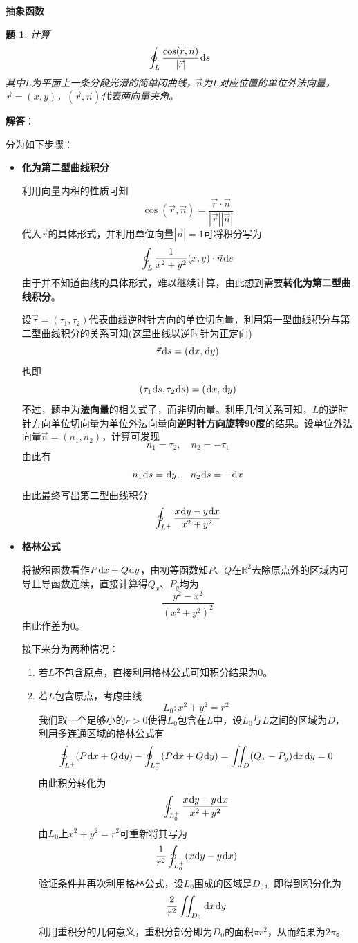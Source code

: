 \documentclass[a4paper,UTF8,fontset=windows,AutoFakeBold]{ctexart}
\newcommand*{\dr}{\hspace{0.07em}\mathrm{d}}
\newcommand*{\nv}{\vec{n}}
\newcommand*{\rb}{\mathbb{R}}
\newcommand*{\rv}{\vec{r}}
\theoremstyle{ex}
\newtheorem{exercise}{题}
\newcommand{\sol}[1]{{\vspace{5pt}\kaishu\noindent\textbf{解答}：\vspace{-3pt}
\begin{compactitem}
    \item[] #1
\end{compactitem}
}}
\begin{document}
\noindent\textbf{抽象函数}
\begin{framed}
\begin{exercise}\label{green normal}
    计算
    $$\oint_L\frac{\cos(\rv,\nv)}{|\rv|}\dr s$$
    其中$L$为平面上一条分段光滑的简单闭曲线，$\nv$为$L$对应位置的单位外法向量，$\rv=(x,y)$，$(\rv,\nv)$代表两向量夹角。
\end{exercise}
\sol{
    分为如下步骤：
    \begin{itemize}
        \item \textbf{化为第二型曲线积分}
        
        利用向量内积的性质可知
        $$\cos(\rv,\nv)=\frac{\rv\cdot\nv}{|\rv||\nv|}$$
        代入$\rv$的具体形式，并利用单位向量$|\nv|=1$可将积分写为
        $$\oint_L\frac{1}{x^2+y^2}(x,y)\cdot\nv\dr s$$
        由于并不知道曲线的具体形式，难以继续计算，由此想到需要\textbf{转化为第二型曲线积分}。

        设$\vec\tau=(\tau_1,\tau_2)$代表曲线逆时针方向的单位切向量，利用第一型曲线积分与第二型曲线积分的关系可知(这里曲线以逆时针为正定向)
        $$\vec\tau\dr s=(\dr x,\dr y)$$
        也即
        $$(\tau_1\dr s,\tau_2\dr s)=(\dr x,\dr y)$$
        不过，题中为\textbf{法向量}的相关式子，而非切向量。利用几何关系可知，$L$的逆时针方向单位切向量为单位外法向量\textbf{向逆时针方向旋转90度}的结果。设单位外法向量$\nv=(n_1,n_2)$，计算可发现
        $$n_1=\tau_2,\quad n_2=-\tau_1$$
        由此有
        $$n_1\dr s=\dr y,\quad n_2\dr s=-\dr x$$
        由此最终写出第二型曲线积分
        $$\oint_{L^+}\frac{x\dr y-y\dr x}{x^2+y^2}$$

        \item \textbf{格林公式}
        
        将被积函数看作$P\dr x+Q\dr y$，由初等函数知$P$、$Q$在$\rb^2$去除原点外的区域内可导且导函数连续，直接计算得$Q_x$、$P_y$均为
        $$\frac{y^2-x^2}{(x^2+y^2)^2}$$
        由此作差为0。

        接下来分为两种情况：
        \begin{enumerate}
            \item 若$L$不包含原点，直接利用格林公式可知积分结果为0。
            \item 若$L$包含原点，考虑曲线
            $$L_0\colon x^2+y^2=r^2$$
            我们取一个足够小的$r>0$使得$L_0$包含在$L$中，设$L_0$与$L$之间的区域为$D$，利用多连通区域的格林公式有
            $$\oint_{L^+}(P\dr x+Q\dr y)-\oint_{L_0^+}(P\dr x+Q\dr y)=\iint_D(Q_x-P_y)\dr x\dr y=0$$
            由此积分转化为
            $$\oint_{L_0^+}\frac{x\dr y-y\dr x}{x^2+y^2}$$
            由$L_0$上$x^2+y^2=r^2$可重新将其写为
            $$\frac{1}{r^2}\oint_{L_0^+}(x\dr y-y\dr x)$$
            验证条件并再次利用格林公式，设$L_0$围成的区域是$D_0$，即得到积分化为
            $$\frac{2}{r^2}\iint_{D_0}\dr x\dr y$$
            利用重积分的几何意义，重积分部分即为$D_0$的面积$\pi r^2$，从而结果为$2\pi$。
        \end{enumerate}
    \end{itemize}
}
\end{framed}
\end{document}
